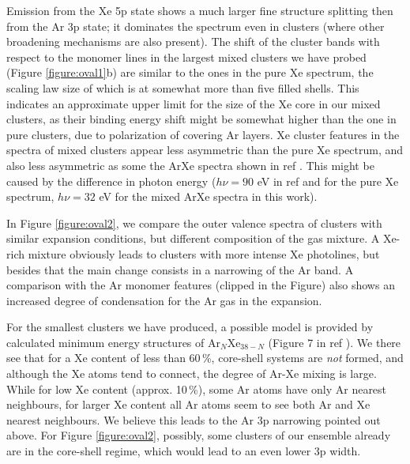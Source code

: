 Emission from the Xe 5p state shows a much larger fine structure splitting then from the Ar 3p state; it dominates the spectrum even in clusters (where other broadening mechanisms are also present).
The shift of the cluster bands with respect to the monomer lines in the largest mixed clusters we have probed (Figure \ref{figure:oval1}b) are similar to the ones in the pure Xe spectrum, the scaling law size of which is at somewhat more than five filled shells.
This indicates an approximate upper limit for the size of the Xe core in our mixed clusters, as their binding energy shift might be somewhat higher than the one in pure clusters, due to polarization of covering Ar layers.
Xe cluster features in the spectra of mixed clusters appear less asymmetric than the pure Xe spectrum, and also less asymmetric as some the ArXe spectra shown in ref .
This might be caused by the difference in photon energy ($h\nu = 90$ eV in ref  and for the pure Xe spectrum, $h\nu = 32$ eV for the mixed ArXe spectra in this work).


In Figure \ref{figure:oval2}, we compare the outer valence spectra of clusters with similar expansion conditions, but different composition of the gas mixture.
A Xe-rich mixture obviously leads to clusters with more intense Xe photolines, but besides that the main change consists in a narrowing of the Ar band.
A comparison with the Ar monomer features (clipped in the Figure) also shows an increased degree of condensation for the Ar gas in the expansion.

For the smallest clusters we have produced, a possible model is provided by calculated minimum energy structures of Ar$_N$Xe$_{38-N}$ (Figure 7 in ref ).
We there see that for a Xe content of less than 60\,\%, core-shell systems are {\it not} formed, and although the Xe atoms tend to connect, the degree of Ar-Xe mixing is large.
While for low Xe content (approx. 10\,\%), some Ar atoms have only Ar nearest neighbours, for larger Xe content all Ar atoms seem to see both Ar and Xe nearest neighbours.
We believe this leads to the Ar 3p narrowing pointed out above.
For Figure \ref{figure:oval2}, possibly, some clusters of our ensemble already are in the core-shell regime, which would lead to an even lower 3p width.

